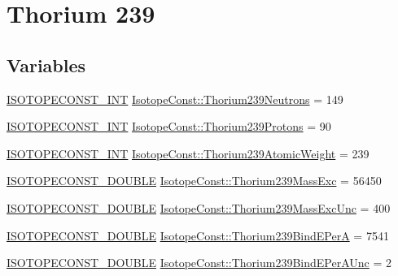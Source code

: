 \hypertarget{group___isotope_const-_thorium-_th239}{}\section{Thorium 239}
\label{group___isotope_const-_thorium-_th239}
\subsection*{Variables}
\begin{DoxyCompactItemize}
\item 
\mbox{\hyperlink{group___isotope_const-_macros_ga5f18360b3e99483a35c32d789e62621c}{I\+S\+O\+T\+O\+P\+E\+C\+O\+N\+S\+T\+\_\+\+I\+NT}} \mbox{\hyperlink{group___isotope_const-_thorium-_th239_ga00d55f16829b11befe8dbb7f16db8caf}{Isotope\+Const\+::\+Thorium239\+Neutrons}} = 149
\item 
\mbox{\hyperlink{group___isotope_const-_macros_ga5f18360b3e99483a35c32d789e62621c}{I\+S\+O\+T\+O\+P\+E\+C\+O\+N\+S\+T\+\_\+\+I\+NT}} \mbox{\hyperlink{group___isotope_const-_thorium-_th239_gafaf295d963b5751cc6ffc0f604b58378}{Isotope\+Const\+::\+Thorium239\+Protons}} = 90
\item 
\mbox{\hyperlink{group___isotope_const-_macros_ga5f18360b3e99483a35c32d789e62621c}{I\+S\+O\+T\+O\+P\+E\+C\+O\+N\+S\+T\+\_\+\+I\+NT}} \mbox{\hyperlink{group___isotope_const-_thorium-_th239_ga7ee81ecf935c5b02d5c3b64af484842d}{Isotope\+Const\+::\+Thorium239\+Atomic\+Weight}} = 239
\item 
\mbox{\hyperlink{group___isotope_const-_macros_ga8f45a7272ce02c0b4c65c44636ed719a}{I\+S\+O\+T\+O\+P\+E\+C\+O\+N\+S\+T\+\_\+\+D\+O\+U\+B\+LE}} \mbox{\hyperlink{group___isotope_const-_thorium-_th239_ga675bf0d62206a3635201f29ef69b56b9}{Isotope\+Const\+::\+Thorium239\+Mass\+Exc}} = 56450
\item 
\mbox{\hyperlink{group___isotope_const-_macros_ga8f45a7272ce02c0b4c65c44636ed719a}{I\+S\+O\+T\+O\+P\+E\+C\+O\+N\+S\+T\+\_\+\+D\+O\+U\+B\+LE}} \mbox{\hyperlink{group___isotope_const-_thorium-_th239_ga2cae89331a1855e22b6297618dca477a}{Isotope\+Const\+::\+Thorium239\+Mass\+Exc\+Unc}} = 400
\item 
\mbox{\hyperlink{group___isotope_const-_macros_ga8f45a7272ce02c0b4c65c44636ed719a}{I\+S\+O\+T\+O\+P\+E\+C\+O\+N\+S\+T\+\_\+\+D\+O\+U\+B\+LE}} \mbox{\hyperlink{group___isotope_const-_thorium-_th239_gac96ac40c5064481e0315cddfe2f80d2c}{Isotope\+Const\+::\+Thorium239\+Bind\+E\+PerA}} = 7541
\item 
\mbox{\hyperlink{group___isotope_const-_macros_ga8f45a7272ce02c0b4c65c44636ed719a}{I\+S\+O\+T\+O\+P\+E\+C\+O\+N\+S\+T\+\_\+\+D\+O\+U\+B\+LE}} \mbox{\hyperlink{group___isotope_const-_thorium-_th239_ga12daa20b89917659fd5d15024f7c431b}{Isotope\+Const\+::\+Thorium239\+Bind\+E\+Per\+A\+Unc}} = 2

\end{DoxyCompactItemize}
